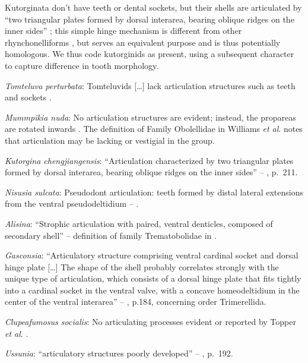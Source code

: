 \documentclass[openany]{book}
\theoremstyle{definition}
\theoremstyle{definition}
\theoremstyle{definition}
\theoremstyle{remark}
\begin{document}
Kutorginata don't have teeth or dental sockets, but their shells are
articulated by ``two triangular plates formed by dorsal interarea,
bearing oblique ridges on the inner sides''
\citep[p.~211]{Williams2000BrachiopodaLinguliformea}; this simple hinge
mechanism is different from other rhynchonelliforms
\citep[p.208]{Williams2000BrachiopodaLinguliformea}, but serves an
equivalent purpose and is thus potentially homologous. We thus code
kutorginids as present, using a subsequent character to capture
difference in tooth morphology.

\emph{Tomteluva perturbata}: Tomteluvids {[}\ldots{}{]} lack
articulation structures such as teeth and sockets
\citep{Streng2016Anew}.

\emph{Mummpikia nuda}: No articulation structures are evident; instead,
the propareas are rotated inwards \citep{Balthasar2008iMummpikia}. The
definition of Family Obolellidae in Williams \emph{et al}.
\citeyearpar{Williams2000BrachiopodaLinguliformea} notes that
articulation may be lacking or vestigial in the group.

\emph{Kutorgina chengjiangensis}: ``Articulation characterized by two
triangular plates formed by dorsal interarea, bearing oblique ridges on
the inner sides'' -- \citet{Williams2000BrachiopodaLinguliformea},
p.~211.

\emph{Nisusia sulcata}: Pseudodont articulation: teeth formed by distal
lateral extensions from the ventral pseudodeltidium --
\citet{Holmer2018Evolutionarysignificance}.

\emph{Alisina}: ``Strophic articulation with paired, ventral denticles,
composed of secondary shell'' -- definition of family Trematobolidae in
\citet{Williams2000BrachiopodaLinguliformea}.

\emph{Gasconsia}: ``Articulatory structure comprising ventral cardinal
socket and dorsal hinge plate {[}\ldots{}{]} The shape of the shell
probably correlates strongly with the unique type of articulation, which
consists of a dorsal hinge plate that fits tightly into a cardinal
socket in the ventral valve, with a concave homeodeltidium in the center
of the ventral interarea'' --
\citet{Williams2000BrachiopodaLinguliformea}, p.184, concerning order
Trimerellida.

\emph{Clupeafumosus socialis}: No articulating processes evident or
reported by Topper \emph{et al}. \citeyearpar{Topper2013Reappraisalof}.

\emph{Ussunia}: ``articulatory structures poorly developed'' --
\citet{Williams2000BrachiopodaLinguliformea}, p.~192.
\end{document}
